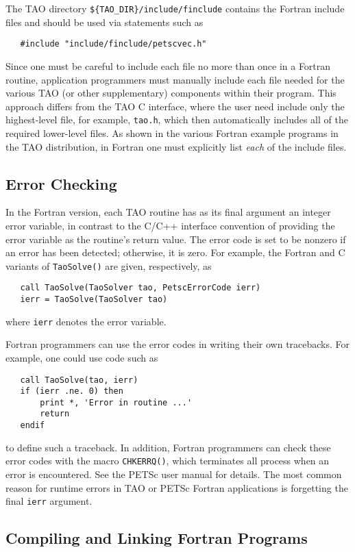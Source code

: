 The TAO directory {\tt \$\{TAO\_DIR\}/include/finclude}
contains the Fortran include files
and should be used via statements 
such as 
\begin{verbatim}
   #include "include/finclude/petscvec.h"
\end{verbatim}
Since one must be careful to include each file no more than once
in a Fortran routine, application programmers must manually include
each file needed for the various TAO (or other supplementary)
components within their program.  This approach differs from the TAO
C interface, where the user need include only the highest-level
file, for example, {\tt tao.h}, which then automatically
includes all of the required lower-level files.  As shown in the
various Fortran example programs in the TAO distribution, in Fortran
one must explicitly list {\em each} of the include files.


\subsection{Error Checking}
\label{sec:fortran_errors}

In the Fortran version, each TAO routine has as its final argument
an integer error variable, in contrast to the C/C++ interface convention 
of providing the error variable as the routine's return value.  The error
code is set to be nonzero if an error has been detected; otherwise, it
is zero.  For example, the Fortran and C variants of {\tt TaoSolve()} are
given, respectively, as 
\begin{verbatim}
   call TaoSolve(TaoSolver tao, PetscErrorCode ierr)
   ierr = TaoSolve(TaoSolver tao)
\end{verbatim}
where {\tt ierr} denotes the error variable.

Fortran programmers can use the error codes in writing their own
tracebacks.  For example, one could use code such as 
\begin{verbatim}
   call TaoSolve(tao, ierr)
   if (ierr .ne. 0) then
       print *, 'Error in routine ...'
       return
   endif
\end{verbatim}
to define such a traceback. 
In addition, Fortran programmers can check these error codes with the
macro {\tt CHKERRQ()}, which terminates all process when an error
is encountered.  See the PETSc user manual for details.  The most
common reason for runtime errors in TAO or PETSc Fortran applications is 
forgetting 
the final {\tt ierr} argument.

\subsection{Compiling and Linking Fortran Programs}
\label{sec:fortcompile}

